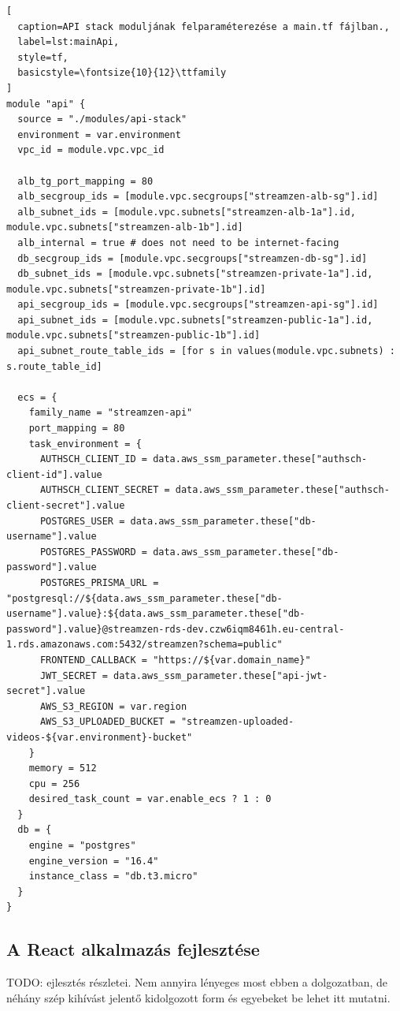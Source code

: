 \begin{lstlisting}[
  caption=API stack moduljának felparaméterezése a main.tf fájlban.,
  label=lst:mainApi,
  style=tf,
  basicstyle=\fontsize{10}{12}\ttfamily
]
module "api" {
  source = "./modules/api-stack"
  environment = var.environment
  vpc_id = module.vpc.vpc_id

  alb_tg_port_mapping = 80
  alb_secgroup_ids = [module.vpc.secgroups["streamzen-alb-sg"].id]
  alb_subnet_ids = [module.vpc.subnets["streamzen-alb-1a"].id, module.vpc.subnets["streamzen-alb-1b"].id]
  alb_internal = true # does not need to be internet-facing
  db_secgroup_ids = [module.vpc.secgroups["streamzen-db-sg"].id]
  db_subnet_ids = [module.vpc.subnets["streamzen-private-1a"].id, module.vpc.subnets["streamzen-private-1b"].id]
  api_secgroup_ids = [module.vpc.secgroups["streamzen-api-sg"].id]
  api_subnet_ids = [module.vpc.subnets["streamzen-public-1a"].id, module.vpc.subnets["streamzen-public-1b"].id]
  api_subnet_route_table_ids = [for s in values(module.vpc.subnets) : s.route_table_id]

  ecs = {
    family_name = "streamzen-api"
    port_mapping = 80
    task_environment = {
      AUTHSCH_CLIENT_ID = data.aws_ssm_parameter.these["authsch-client-id"].value
      AUTHSCH_CLIENT_SECRET = data.aws_ssm_parameter.these["authsch-client-secret"].value
      POSTGRES_USER = data.aws_ssm_parameter.these["db-username"].value
      POSTGRES_PASSWORD = data.aws_ssm_parameter.these["db-password"].value
      POSTGRES_PRISMA_URL = "postgresql://${data.aws_ssm_parameter.these["db-username"].value}:${data.aws_ssm_parameter.these["db-password"].value}@streamzen-rds-dev.czw6iqm8461h.eu-central-1.rds.amazonaws.com:5432/streamzen?schema=public"
      FRONTEND_CALLBACK = "https://${var.domain_name}"
      JWT_SECRET = data.aws_ssm_parameter.these["api-jwt-secret"].value
      AWS_S3_REGION = var.region
      AWS_S3_UPLOADED_BUCKET = "streamzen-uploaded-videos-${var.environment}-bucket"
    }
    memory = 512
    cpu = 256
    desired_task_count = var.enable_ecs ? 1 : 0
  }
  db = {
    engine = "postgres"
    engine_version = "16.4"
    instance_class = "db.t3.micro"
  }
}
\end{lstlisting}

\subsection{A React alkalmazás fejlesztése}

TODO: ejlesztés részletei. Nem annyira lényeges most ebben a dolgozatban, de néhány szép kihívást jelentő kidolgozott form és egyebeket be lehet itt mutatni.

